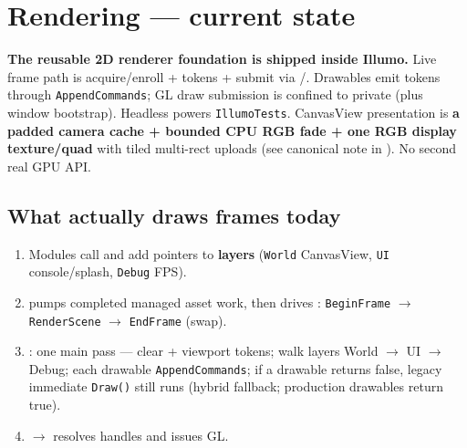\section{Rendering --- current state}
\label{sec:rendering-current}

\begin{statusbox}
\textbf{The reusable 2D renderer foundation is shipped inside Illumo.} Live
frame path is acquire/enroll + tokens + submit via
/.
Drawables emit tokens through \texttt{AppendCommands}; GL draw submission is
confined to private  (plus window
bootstrap). Headless 
powers \texttt{IllumoTests}. CanvasView
presentation is \textbf{a padded camera cache + bounded CPU RGB fade + one RGB
display texture/quad} with tiled multi-rect uploads (see canonical note in
).
No second real GPU API.
\end{statusbox}

\subsection{What actually draws frames today}
\begin{enumerate}
  \item Modules call  and add 
        pointers to  \textbf{layers}
        (\texttt{World} CanvasView, \texttt{UI} console/splash, \texttt{Debug} FPS).
  \item {} pumps completed managed asset work, then
        drives :
        \texttt{BeginFrame} $\rightarrow$ \texttt{RenderScene} $\rightarrow$
        \texttt{EndFrame} (swap).
  \item {}:
        one main pass --- clear + viewport tokens; walk layers
        World $\rightarrow$ UI $\rightarrow$ Debug; each drawable
        \texttt{AppendCommands}; if a drawable returns false, legacy immediate
        \texttt{Draw()} still runs (hybrid fallback; production drawables return true).
  \item {} $\rightarrow$
         resolves handles and issues GL.
\end{enumerate}

